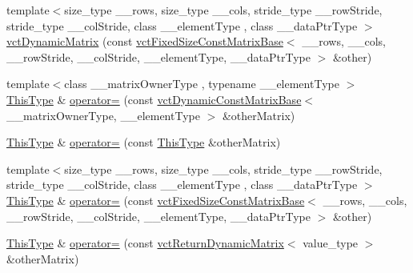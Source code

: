 \begin{DoxyCompactItemize}
\item 
{\footnotesize template$<$size\+\_\+type \+\_\+\+\_\+rows, size\+\_\+type \+\_\+\+\_\+cols, stride\+\_\+type \+\_\+\+\_\+row\+Stride, stride\+\_\+type \+\_\+\+\_\+col\+Stride, class \+\_\+\+\_\+element\+Type , class \+\_\+\+\_\+data\+Ptr\+Type $>$ }\\\hyperlink{classvct_dynamic_matrix_ab7a654d065180b208eb61efa2cf768c6}{vct\+Dynamic\+Matrix} (const \hyperlink{classvct_fixed_size_const_matrix_base}{vct\+Fixed\+Size\+Const\+Matrix\+Base}$<$ \+\_\+\+\_\+rows, \+\_\+\+\_\+cols, \+\_\+\+\_\+row\+Stride, \+\_\+\+\_\+col\+Stride, \+\_\+\+\_\+element\+Type, \+\_\+\+\_\+data\+Ptr\+Type $>$ \&other)
\item 
{\footnotesize template$<$class \+\_\+\+\_\+matrix\+Owner\+Type , typename \+\_\+\+\_\+element\+Type $>$ }\\\hyperlink{classvct_dynamic_const_matrix_base_ac4ff48cbe4d9de3fdef5a02447ffb9db}{This\+Type} \& \hyperlink{classvct_dynamic_matrix_ac0062998c00df7a4e5155c3eac8fddb0}{operator=} (const \hyperlink{classvct_dynamic_const_matrix_base}{vct\+Dynamic\+Const\+Matrix\+Base}$<$ \+\_\+\+\_\+matrix\+Owner\+Type, \+\_\+\+\_\+element\+Type $>$ \&other\+Matrix)
\item 
\hyperlink{classvct_dynamic_const_matrix_base_ac4ff48cbe4d9de3fdef5a02447ffb9db}{This\+Type} \& \hyperlink{classvct_dynamic_matrix_a1ba744edd673ccf244e0c7ad521e47d1}{operator=} (const \hyperlink{classvct_dynamic_const_matrix_base_ac4ff48cbe4d9de3fdef5a02447ffb9db}{This\+Type} \&other\+Matrix)
\item 
{\footnotesize template$<$size\+\_\+type \+\_\+\+\_\+rows, size\+\_\+type \+\_\+\+\_\+cols, stride\+\_\+type \+\_\+\+\_\+row\+Stride, stride\+\_\+type \+\_\+\+\_\+col\+Stride, class \+\_\+\+\_\+element\+Type , class \+\_\+\+\_\+data\+Ptr\+Type $>$ }\\\hyperlink{classvct_dynamic_const_matrix_base_ac4ff48cbe4d9de3fdef5a02447ffb9db}{This\+Type} \& \hyperlink{classvct_dynamic_matrix_a3ca1f15a54f2ae80c054535ed01a60c5}{operator=} (const \hyperlink{classvct_fixed_size_const_matrix_base}{vct\+Fixed\+Size\+Const\+Matrix\+Base}$<$ \+\_\+\+\_\+rows, \+\_\+\+\_\+cols, \+\_\+\+\_\+row\+Stride, \+\_\+\+\_\+col\+Stride, \+\_\+\+\_\+element\+Type, \+\_\+\+\_\+data\+Ptr\+Type $>$ \&other)
\item 
\hyperlink{classvct_dynamic_const_matrix_base_ac4ff48cbe4d9de3fdef5a02447ffb9db}{This\+Type} \& \hyperlink{classvct_dynamic_matrix_a8c20bdf6d0df4b4271cb970dd8f225bd}{operator=} (const \hyperlink{classvct_return_dynamic_matrix}{vct\+Return\+Dynamic\+Matrix}$<$ value\+\_\+type $>$ \&other\+Matrix)

\end{DoxyCompactItemize}
